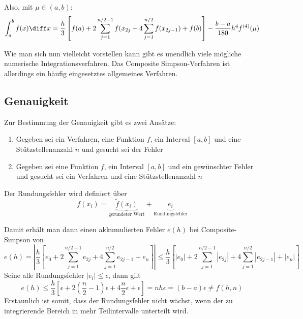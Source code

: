 Also, mit $\mu \in (a, b)$:
\begin{equation}
	\int_a^b f(x) \diff x = \frac{h}{3} \left[ f(a) + 2 \sum_{j = 1}^{n/2 - 1} f(x_{2j} + 4 \sum_{j = 1}^{n/2} f(x_{2j - 1}) + f(b) \right] - \frac{b - a}{180} h^4 f^{(4)}(\mu)
\end{equation}

Wie man sich nun vielleicht vorstellen kann gibt es unendlich viele mögliche numerische Integrationsverfahren. Das Composite Simpson-Verfahren ist allerdings ein häufig eingesetztes allgemeines Verfahren.

\subsection{Genauigkeit}
Zur Bestimmung der Genauigkeit gibt es zwei Ansätze:
\begin{enumerate}
	\item Gegeben sei ein Verfahren, eine Funktion $f$, ein Interval $[a, b]$ und eine Stützstellenanzahl $n$ und gesucht sei der Fehler
	\item Gegeben sei eine Funktion $f$, ein Interval $[a, b]$ und ein gewünschter Fehler und gesucht sei ein Verfahren und eine Stützstellenanzahl $n$
\end{enumerate}

Der Rundungsfehler wird definiert über
\begin{equation}
	f(x_i) = \underbrace{\tilde{f}(x_i)}_{\text{gerundeter Wert}} + \underbrace{e_i}_{\text{Rundungsfehler}}
\end{equation}

Damit erhält man dann einen akkumulierten Fehler $e(h)$ bei Composite-Simpson von
\begin{equation}
	e(h) = \left| \frac{h}{3} \left[ e_0 + 2 \sum_{j = 1}^{n/2 - 1} e_{2j} + 4 \sum_{j = 1}^{n/2} e_{2j - 1} + e_n \right] \right| \le \frac{h}{3} \left[ |e_0| + 2 \sum_{j = 1}^{n/2 - 1} |e_{2j}| + 4 \sum_{j = 1}^{n/2} |e_{2j - 1}| + |e_n| \right]
\end{equation}
Seine alle Rundungsfehler $|e_i| \le \epsilon$, dann gilt
\begin{equation}
	e(h) \le \frac{h}{3} \left[ \epsilon + 2(\frac{n}{2} - 1) \epsilon + 4 \frac{n}{2} \epsilon + \epsilon \right] = n h \epsilon = (b - a) \epsilon \ne f(h, n)
\end{equation}
Erstaunlich ist somit, dass der Rundungsfehler nicht wächst, wenn der zu integrierende Bereich in mehr Teilintervalle unterteilt wird. 
